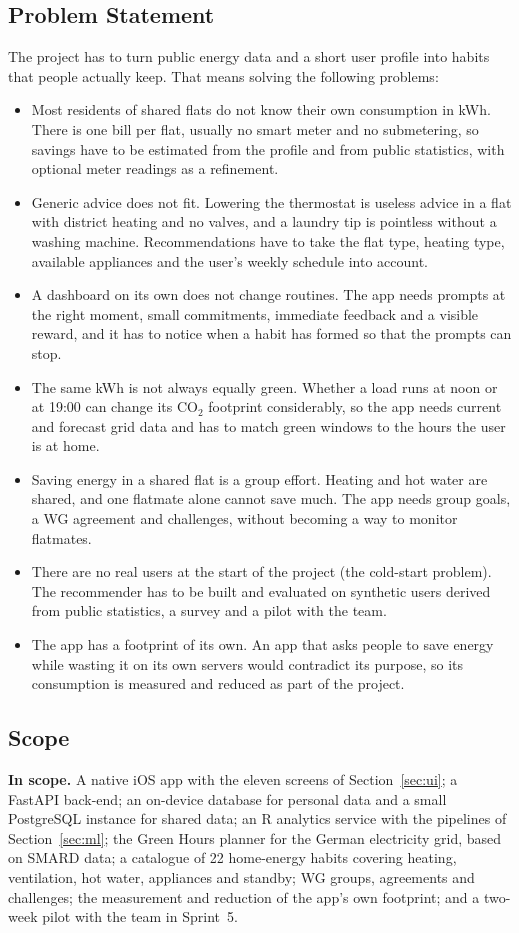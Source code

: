 \documentclass[conference]{IEEEtran}
\newcommand{\COtwo}{CO$_2$}
\begin{document}
\subsection{Problem Statement}
The project has to turn public energy data and a short user profile into habits that people actually keep. That means solving the following problems:
\begin{itemize}
\item Most residents of shared flats do not know their own consumption in kWh. There is one bill per flat, usually no smart meter and no submetering, so savings have to be estimated from the profile and from public statistics, with optional meter readings as a refinement.
\item Generic advice does not fit. Lowering the thermostat is useless advice in a flat with district heating and no valves, and a laundry tip is pointless without a washing machine. Recommendations have to take the flat type, heating type, available appliances and the user's weekly schedule into account.
\item A dashboard on its own does not change routines. The app needs prompts at the right moment, small commitments, immediate feedback and a visible reward, and it has to notice when a habit has formed so that the prompts can stop.
\item The same kWh is not always equally green. Whether a load runs at noon or at 19:00 can change its \COtwo{} footprint considerably, so the app needs current and forecast grid data and has to match green windows to the hours the user is at home.
\item Saving energy in a shared flat is a group effort. Heating and hot water are shared, and one flatmate alone cannot save much. The app needs group goals, a WG agreement and challenges, without becoming a way to monitor flatmates.
\item There are no real users at the start of the project (the cold-start problem). The recommender has to be built and evaluated on synthetic users derived from public statistics, a survey and a pilot with the team.
\item The app has a footprint of its own. An app that asks people to save energy while wasting it on its own servers would contradict its purpose, so its consumption is measured and reduced as part of the project.
\end{itemize}

\subsection{Scope}
\label{sec:scope}
\textbf{In scope.} A native iOS app with the eleven screens of Section~\ref{sec:ui}; a FastAPI back-end; an on-device database for personal data and a small PostgreSQL instance for shared data; an R analytics service with the pipelines of Section~\ref{sec:ml}; the Green Hours planner for the German electricity grid, based on SMARD data; a catalogue of 22 home-energy habits covering heating, ventilation, hot water, appliances and standby; WG groups, agreements and challenges; the measurement and reduction of the app's own footprint; and a two-week pilot with the team in Sprint~5.
\end{document}
